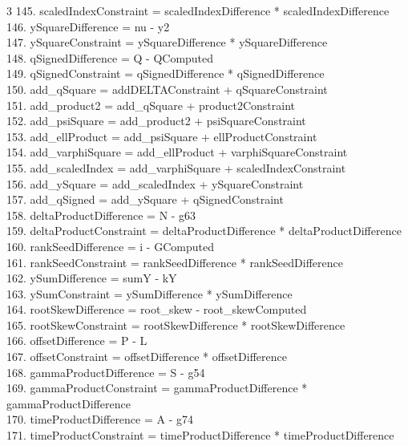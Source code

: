 \documentclass[10pt]{article}
\begin{document}
\begin{multicols}{3}
145. scaledIndexConstraint = scaledIndexDifference * scaledIndexDifference\\
146. ySquareDifference = nu - y2\\
147. ySquareConstraint = ySquareDifference * ySquareDifference\\
148. qSignedDifference = Q - QComputed\\
149. qSignedConstraint = qSignedDifference * qSignedDifference\\
150. add\_qSquare = addDELTAConstraint + qSquareConstraint\\
151. add\_product2 = add\_qSquare + product2Constraint\\
152. add\_psiSquare = add\_product2 + psiSquareConstraint\\
153. add\_ellProduct = add\_psiSquare + ellProductConstraint\\
154. add\_varphiSquare = add\_ellProduct + varphiSquareConstraint\\
155. add\_scaledIndex = add\_varphiSquare + scaledIndexConstraint\\
156. add\_ySquare = add\_scaledIndex + ySquareConstraint\\
157. add\_qSigned = add\_ySquare + qSignedConstraint\\
158. deltaProductDifference = N - g63\\
159. deltaProductConstraint = deltaProductDifference * deltaProductDifference\\
160. rankSeedDifference = i - GComputed\\
161. rankSeedConstraint = rankSeedDifference * rankSeedDifference\\
162. ySumDifference = sumY - kY\\
163. ySumConstraint = ySumDifference * ySumDifference\\
164. rootSkewDifference = root\_skew - root\_skewComputed\\
165. rootSkewConstraint = rootSkewDifference * rootSkewDifference\\
166. offsetDifference = P - L\\
167. offsetConstraint = offsetDifference * offsetDifference\\
168. gammaProductDifference = S - g54\\
169. gammaProductConstraint = gammaProductDifference * gammaProductDifference\\
170. timeProductDifference = A - g74\\
171. timeProductConstraint = timeProductDifference * timeProductDifference\\

\end{multicols}
\end{document}
